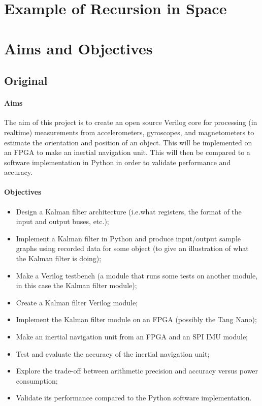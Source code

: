 \documentclass[12pt]{article}
\begin{document}


\section{Example of Recursion in Space}
\label{recursion_space}



\section{Aims and Objectives}

\subsection*{Original}

\paragraph{Aims}

The aim of this project is to create an open source Verilog core for processing (in realtime) measurements from accelerometers, gyroscopes, and magnetometers to estimate the orientation and position of an object. This will be implemented on an FPGA to make an inertial navigation unit. This will then be compared to a software implementation in Python in order to validate performance and accuracy.

\paragraph{Objectives}

\begin{itemize}[noitemsep]
	\item Design a Kalman filter architecture (i.e.\@ what registers, the format of the input and output buses, etc.);
	\item Implement a Kalman filter in Python and produce input/output sample graphs using recorded data for some object (to give an illustration of what the Kalman filter is doing);
	\item Make a Verilog testbench (a module that runs some tests on another module, in this case the Kalman filter module);
	\item Create a Kalman filter Verilog module;
	\item Implement the Kalman filter module on an FPGA (possibly the Tang Nano);
	\item Make an inertial navigation unit from an FPGA and an SPI IMU module;
	\item Test and evaluate the accuracy of the inertial navigation unit;
	\item Explore the trade-off between arithmetic precision and accuracy versus power consumption;
	\item Validate its performance compared to the Python software implementation.
\end{itemize}
\end{document}
